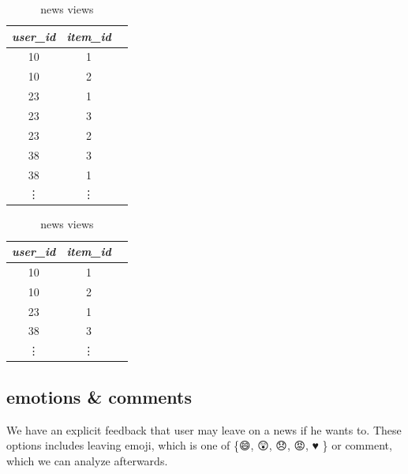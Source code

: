 \documentclass{article}
\begin{document}
\begin{table}[h]
    \parbox{.45\textwidth}{
        \centering
        \begin{tabular}{ccc}
            \toprule

            \emph{user\_id} & \emph{item\_id} \\\midrule
            10 & 1  \\
            10 & 2  \\
            23 & 1  \\
            23 & 3  \\
            23 & 2  \\
            38 & 3  \\
            38 & 1  \\
            \vdots & \vdots  \\\bottomrule
        \end{tabular}
        \caption{news shows}
        \label{tab:show}
    }
    \hfill
    \parbox{.45\textwidth}{
        \centering
        \begin{tabular}{ccc}
            \toprule

            \emph{user\_id} & \emph{item\_id} \\\midrule
            10 & 1  \\
            10 & 2  \\
            23 & 1  \\
            38 & 3  \\
            \vdots & \vdots  \\\bottomrule
        \end{tabular}
        \caption{news views}
        \label{tab:view}
        }
\end{table}   





\subsection*{emotions \& comments}

We have an explicit feedback that user may leave on a news if he wants to. These options includes leaving emoji, which is one of \{{\DejaSans 😄, 😲, 😞, 😡, ♥ }\} or comment, which we can analyze afterwards.
\end{document}
